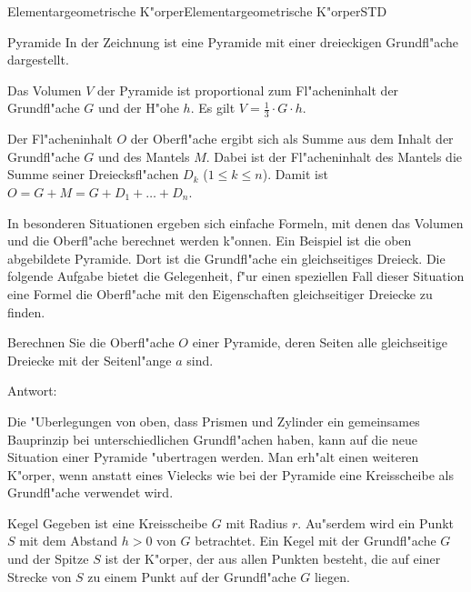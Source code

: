 \begin{MXContent}{Elementargeometrische K"orper}{Elementargeometrische K"orper}{STD}
\begin{MXInfo}{Pyramide}
In der Zeichnung ist eine Pyramide mit einer dreieckigen Grundfl"ache 
dargestellt.

Das Volumen $V$ der Pyramide ist proportional zum Fl"acheninhalt der 
Grundfl"ache $G$ und der H"ohe $h$. 
Es gilt $V = \frac{1}{3} \cdot G \cdot h$.

Der Fl"acheninhalt $O$ der Oberfl"ache ergibt sich als Summe aus dem Inhalt 
der Grundfl"ache $G$ und des Mantels $M$. Dabei ist der Fl"acheninhalt des 
Mantels die Summe seiner Dreiecksfl"achen $D_k$ ($1 \leq k \leq n$).
Damit ist $O = G + M = G + D_1 + \ldots + D_n$.
\end{MXInfo}

In besonderen Situationen ergeben sich einfache Formeln, mit denen 
das Volumen und die Oberfl"ache berechnet werden k"onnen. Ein Beispiel ist
die oben abgebildete Pyramide. Dort ist die Grundfl"ache ein gleichseitiges 
Dreieck. Die folgende Aufgabe bietet die Gelegenheit, f"ur einen speziellen
Fall dieser Situation eine Formel %
die Oberfl"ache mit den 
Eigenschaften gleichseitiger Dreiecke zu finden.

\begin{MExercise}
Berechnen Sie %
die Oberfl"ache $O$ einer Pyramide, deren 
Seiten alle gleichseitige Dreiecke mit der Seitenl"ange $a$ sind.

Antwort: %
{}
\end{MExercise}


Die "Uberlegungen von oben, dass Prismen und Zylinder ein gemeinsames 
Bauprinzip bei unterschiedlichen Grundfl"achen haben, kann auf die neue 
Situation einer Pyramide "ubertragen werden.
Man erh"alt einen weiteren K"orper, wenn anstatt eines Vielecks wie bei der 
Pyramide eine Kreisscheibe als Grundfl"ache verwendet wird.

\begin{MXInfo}{Kegel}
Gegeben ist eine Kreisscheibe $G$ mit Radius $r$.
Au"serdem wird ein Punkt $S$ mit dem Abstand $h > 0$ von $G$ betrachtet.
Ein Kegel mit der Grundfl"ache $G$ und der Spitze $S$ ist der K"orper,
der aus allen Punkten besteht, die auf einer Strecke von $S$ zu einem 
Punkt auf der Grundfl"ache $G$ liegen.


\end{MXInfo}
\end{MXContent}
